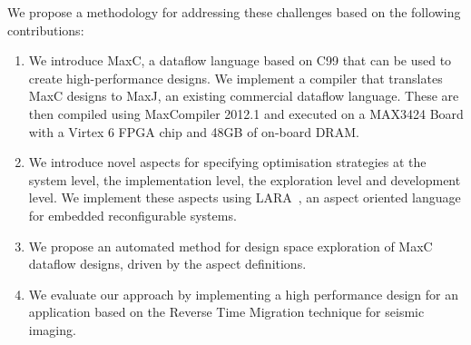 We propose a methodology for addressing these challenges based on the
following contributions:
\begin{enumerate}
\item We introduce MaxC, a dataflow language based on C99 that can be
  used to create high-performance designs. We implement a compiler
  that translates MaxC designs to MaxJ, an existing commercial dataflow
  language. These are then compiled using MaxCompiler 2012.1 and
  executed on a MAX3424 Board with a Virtex 6 FPGA chip and 48GB of
  on-board DRAM.
\item We introduce novel aspects for specifying optimisation
  strategies at the system level, the implementation level, the
  exploration level and development level. We implement these aspects
  using
  LARA~\cite{Cardoso:Carvalho:Cutinho:Luk:Nobre:Diniz:Petrov:2012}, an
  aspect oriented language for embedded reconfigurable systems.
\item We propose an automated method for design space exploration of
  MaxC dataflow designs, driven by the aspect definitions.
\item We evaluate our approach by implementing a high performance
  design for an application based on the Reverse Time Migration
  technique for seismic imaging.
\end{enumerate}
